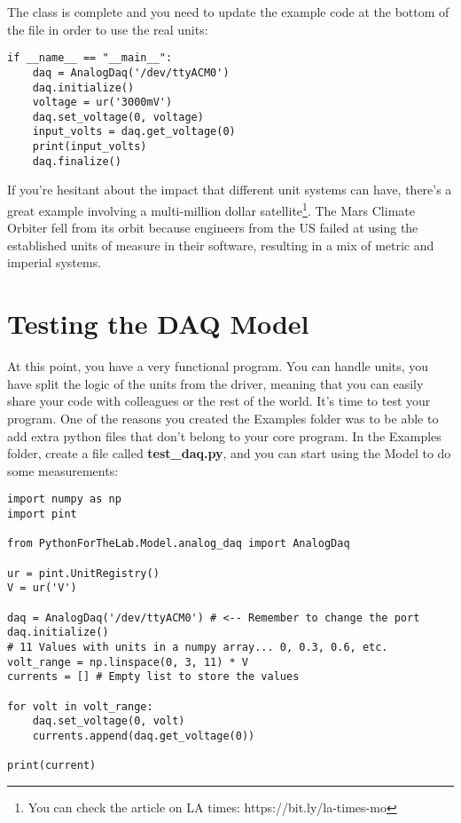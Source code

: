 The class is complete and you need to update the example code at the bottom of the file in order to use the real units:

\begin{verbatim}
if __name__ == "__main__":
    daq = AnalogDaq('/dev/ttyACM0')
    daq.initialize()
    voltage = ur('3000mV')
    daq.set_voltage(0, voltage)
    input_volts = daq.get_voltage(0)
    print(input_volts)
    daq.finalize()
\end{verbatim}

If you're hesitant about the impact that different unit systems can have, there's a great example involving a multi-million dollar satellite\footnote{You can check the article on LA times: https://bit.ly/la-times-mo}. The Mars Climate Orbiter fell from its orbit because engineers from the US failed at using the established units of measure in their software, resulting in a mix of metric and imperial systems.

\section{Testing the DAQ Model}\label{sec:testing-the-daq-model}
At this point, you have a very functional program. You can handle units, you have split the logic of the units from the driver, meaning that you can easily share your code with colleagues or the rest of the world. It's time to test your program. One of the reasons you created the Examples folder was to be able to add extra python files that don't belong to your core program. In the Examples folder, create a file called \textbf{test\_daq.py}, and you can start using the Model to do some measurements:

\begin{verbatim}
import numpy as np
import pint

from PythonForTheLab.Model.analog_daq import AnalogDaq

ur = pint.UnitRegistry()
V = ur('V')

daq = AnalogDaq('/dev/ttyACM0') # <-- Remember to change the port
daq.initialize()
# 11 Values with units in a numpy array... 0, 0.3, 0.6, etc.
volt_range = np.linspace(0, 3, 11) * V
currents = [] # Empty list to store the values

for volt in volt_range:
    daq.set_voltage(0, volt)
    currents.append(daq.get_voltage(0))

print(current)
\end{verbatim}

